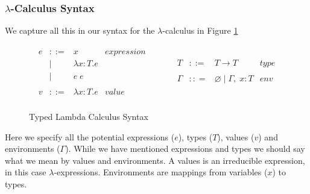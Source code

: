 \documentclass[11pt
              , a4paper
              , twoside
              , openright
              ]{report}
\numberwithin{case}{theorem}
\numberwithin{subcase}{case}
\begin{document}
\subsubsection{$\lambda$-Calculus Syntax}

We capture all this in our syntax for the $\lambda$-calculus in Figure \ref{f:lambda_syntax}
\begin{figure}[h]
\[
\begin{array}{lll}
\begin{array}{lllr}
e & ::= & x & expression \\
& | & \lambda x : T. e &\\
& | & e \; e &\\
&&\\
v & ::= & \lambda x : T. e & value\\
 \end{array}
& ~~~~~~
&
\begin{array}{lllr}
T & ::= & T \rightarrow T & type \\
&&\\
\Gamma & :: = & \varnothing \; | \; \Gamma,\; x : T & env \\
\end{array}
\end{array}
\]
\caption{Typed Lambda Calculus Syntax}
\label{f:lambda_syntax}
\end{figure}
Here we specify all the potential expressions ($e$), types ($T$), values ($v$) and environments ($\Gamma$). While we have mentioned expressions and types we should say what we mean by values and environments. A values is an irreducible expression, in this case $\lambda$-expressions. Environments are mappings from variables ($x$) to types. 
\end{document}
